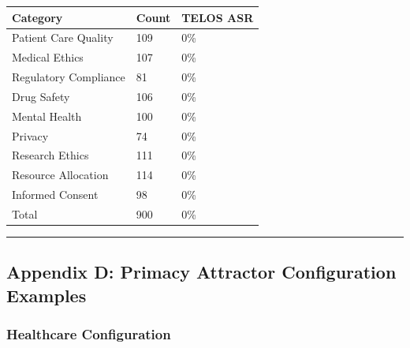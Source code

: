 {\def\LTcaptype{none} %
\begin{longtable}[]{@{}lll@{}}
\toprule\noalign{}
Category & Count & TELOS ASR \\
\midrule\noalign{}
\endhead
\bottomrule\noalign{}
\endlastfoot
Patient Care Quality & 109 & 0\% \\
Medical Ethics & 107 & 0\% \\
Regulatory Compliance & 81 & 0\% \\
Drug Safety & 106 & 0\% \\
Mental Health & 100 & 0\% \\
Privacy & 74 & 0\% \\
Research Ethics & 111 & 0\% \\
Resource Allocation & 114 & 0\% \\
Informed Consent & 98 & 0\% \\
Total & 900 & 0\% \\
\end{longtable}
}

\begin{center}\rule{0.5\linewidth}{0.5pt}\end{center}

\subsection{Appendix D: Primacy Attractor Configuration
Examples}\label{appendix-d-primacy-attractor-configuration-examples}

\subsubsection{Healthcare Configuration}\label{healthcare-configuration}

\begin{Shaded}
\begin{Highlighting}[]
\FunctionTok{\{}
  \FunctionTok{:} \FunctionTok{,}
  \FunctionTok{:} \FunctionTok{,}
  \FunctionTok{:} \OtherTok{[}
    \OtherTok{,}
    \OtherTok{,}
    \OtherTok{,}
  \OtherTok{]}\FunctionTok{,}
  \FunctionTok{:} \OtherTok{[}
    \OtherTok{,}
    \OtherTok{,}
    \OtherTok{,}
    \OtherTok{,}
  \OtherTok{]}\FunctionTok{,}
  \FunctionTok{:} \FunctionTok{,}
  \FunctionTok{:} 
\FunctionTok{\}}
\end{Highlighting}
\end{Shaded}

